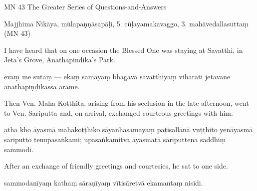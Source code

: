 \begin{samepage}
\begin{leftcolumn*}
MN 43
The Greater Series of Questions-and-Answers
\end{leftcolumn*}

\begin{rightcolumn}
Majjhima Nikāya, mūlapaṇṇāsapāḷi, 5. cūḷayamakavaggo,
3. mahāvedallasuttaṃ (MN 43)
\end{rightcolumn}
\end{samepage}

\begin{samepage}
\begin{leftcolumn*}
I have heard that on one occasion the Blessed One was staying at Savatthi, in Jeta's Grove, Anathapindika's Park.
\end{leftcolumn*}

\begin{rightcolumn}
evaṃ me sutaṃ — ekaṃ samayaṃ bhagavā sāvatthiyaṃ viharati jetavane anāthapiṇḍikassa ārāme.
\end{rightcolumn}
\end{samepage}

\begin{samepage}
\begin{leftcolumn*}
Then Ven. Maha Kotthita, arising from his seclusion in the late afternoon, went to Ven. Sariputta and, on arrival, exchanged courteous greetings with him.
\end{leftcolumn*}

\begin{rightcolumn}
atha kho āyasmā mahākoṭṭhiko sāyanhasamayaṃ paṭisallānā vuṭṭhito yenāyasmā sāriputto tenupasaṅkami; upasaṅkamitvā āyasmatā sāriputtena saddhiṃ sammodi.
\end{rightcolumn}
\end{samepage}

\begin{samepage}
\begin{leftcolumn*}
After an exchange of friendly greetings and courtesies, he sat to one side.
\end{leftcolumn*}

\begin{rightcolumn}
sammodanīyaṃ kathaṃ sāraṇīyaṃ vītisāretvā ekamantaṃ nisīdi.
\end{rightcolumn}
\end{samepage}

